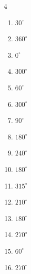 \begin{multicols}{4}
\begin{enumerate}
  \item $\displaystyle 30^{\circ}$

  \item $\displaystyle 360^{\circ}$
        \phantom{$\displaystyle =2\pi$}

  \item $\displaystyle 0^{\circ}$
        \phantom{$\displaystyle =0$}

  \item $\displaystyle 300^{\circ}$

  \item $\displaystyle 60^{\circ}$

  \item $\displaystyle 300^{\circ}$

  \item $\displaystyle 90^{\circ}$

  \item $\displaystyle 180^{\circ}$
        \phantom{$\displaystyle =\pi$}

  \item $\displaystyle 240^{\circ}$

  \item $\displaystyle 180^{\circ}$
        \phantom{$\displaystyle =\pi$}

  \item $\displaystyle 315^{\circ}$

  \item $\displaystyle 210^{\circ}$

  \item $\displaystyle 180^{\circ}$
        \phantom{$\displaystyle =\pi$}

  \item $\displaystyle 270^{\circ}$

  \item $\displaystyle 60^{\circ}$

  \item $\displaystyle 270^{\circ}$


\end{enumerate}
\end{multicols}
